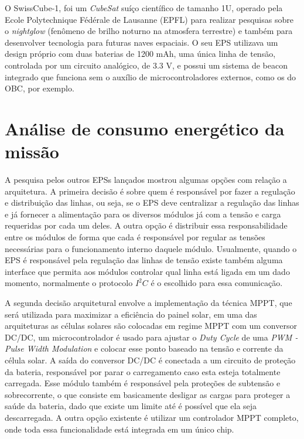 O SwissCube-1, \cite{swisscube_ref}\cite{lessons_swisscube_ref} foi um \textit{CubeSat} suíço científico de tamanho 1U, operado pela Ecole Polytechnique Fédérale de Lausanne (EPFL) para realizar pesquisas sobre o \textit{nightglow} (fenômeno de brilho noturno na atmosfera terrestre) e também para desenvolver tecnologia para futuras naves espaciais. O seu EPS utilizava um design próprio com duas baterias de 1200 mAh, uma única linha de tensão, controlada por um circuito analógico, de 3.3 V,  e possui um sistema de beacon integrado que funciona sem o auxílio de microcontroladores externos, como os do OBC, por exemplo.

\section{Análise de consumo energético da missão}

A pesquisa pelos outros EPSs lançados mostrou algumas opções com relação a arquitetura. A primeira decisão é sobre quem é responsável por fazer a regulação e distribuição das linhas, ou seja, se o EPS deve centralizar a regulação das linhas e já fornecer a alimentação para os diversos módulos já com a tensão e carga requeridas por cada um deles. A outra opção é distribuir essa responsabilidade entre os módulos de forma que cada é responsável por regular as tensões necessárias para o funcionamento interno daquele módulo. Usualmente, quando o EPS é responsável pela regulação das linhas de tensão existe também alguma interface que permita aos módulos controlar qual linha está ligada em um dado momento, normalmente o protocolo $I^{2}C$ é o escolhido para essa comunicação.

A segunda decisão arquitetural envolve a implementação da técnica MPPT, que será utilizada para maximizar a eficiência do painel solar, em uma das arquiteturas as células solares são colocadas em regime MPPT com um conversor DC/DC, um microcontrolador é usado para ajustar o \textit{Duty Cycle} de uma \textit{PWM - Pulse Width Modulation} e colocar esse ponto baseado na tensão e corrente da célula solar. A saída do conversor DC/DC é conectada a um circuito de proteção da bateria, responsável por parar o carregamento caso esta esteja totalmente carregada. Esse módulo também é responsável pela proteções de subtensão e sobrecorrente, o que consiste em basicamente desligar as cargas para proteger a saúde da bateria, dado que existe um limite até é possível que ela seja descarregada. A outra opção existente é utilizar um controlador MPPT completo, onde toda essa funcionalidade está integrada em um único chip.


